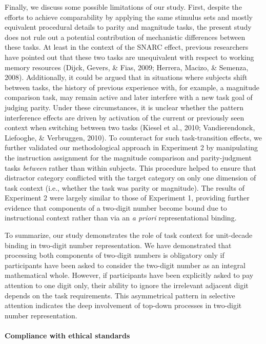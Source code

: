 \documentclass[english,man]{apa6}
\theoremstyle{definition}
\theoremstyle{definition}
\theoremstyle{definition}
\theoremstyle{remark}
\begin{document}
Finally, we discuss some possible limitations of our study. First,
despite the efforts to achieve comparability by applying the same
stimulus sets and mostly equivalent procedural details to parity and
magnitude tasks, the present study does not rule out a potential
contribution of mechanistic differences between these tasks. At least in
the context of the SNARC effect, previous researchers have pointed out
that these two tasks are unequivalent with respect to working memory
resources (Dijck, Gevers, \& Fias, 2009; Herrera, Macizo, \& Semenza,
2008). Additionally, it could be argued that in situations where
subjects shift between tasks, the history of previous experience with,
for example, a magnitude comparison task, may remain active and later
interfere with a new task goal of judging parity. Under these
circumstances, it is unclear whether the pattern interference effects
are driven by activation of the current or previously seen context when
switching between two tasks (Kiesel et al., 2010; Vandierendonck,
Liefooghe, \& Verbruggen, 2010). To counteract for such task-transition
effects, we further validated our methodological approach in Experiment
2 by manipulating the instruction assignment for the magnitude
comparison and parity-judgment tasks \emph{between} rather than within
subjects. This procedure helped to ensure that distractor category
conflicted with the target category on only one dimension of task
context (i.e., whether the task was parity or magnitude). The results of
Experiment 2 were largely similar to those of Experiment 1, providing
further evidence that components of a two-digit number become bound due
to instructional context rather than via an \emph{a priori}
representational binding.

To summarize, our study demonstrates the role of task context for
unit-decade binding in two-digit number representation. We have
demonstrated that processing both components of two-digit numbers is
obligatory only if participants have been asked to consider the
two-digit number as an integral mathematical whole. However, if
participants have been explicitly asked to pay attention to one digit
only, their ability to ignore the irrelevant adjacent digit depends on
the task requirements. This asymmetrical pattern in selective attention
indicates the deep involvement of top-down processes in two-digit number
representation.

\paragraph{Compliance with ethical
standards}\label{compliance-with-ethical-standards}
\end{document}

